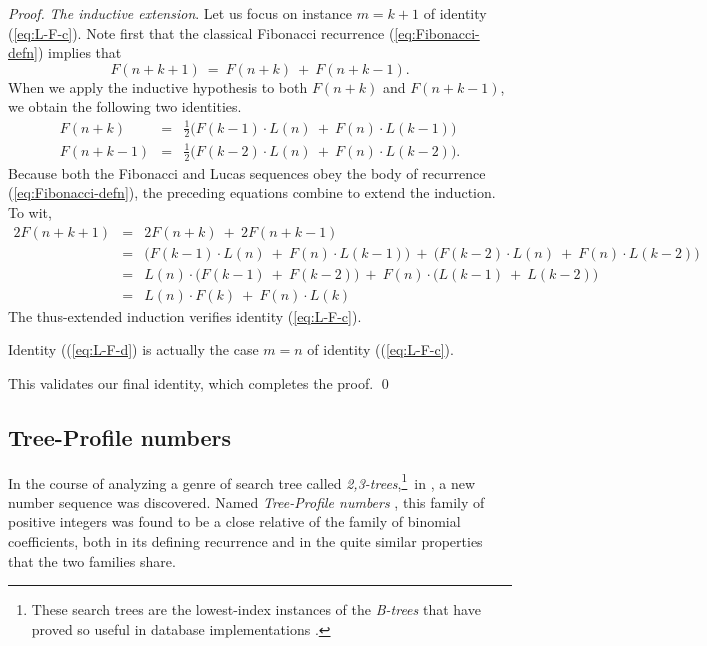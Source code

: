 \begin{proof}
\noindent
{\it The inductive extension}.
Let us focus on instance $m = k+1$ of identity (\ref{eq:L-F-c}).  Note
first that the classical Fibonacci recurrence
(\ref{eq:Fibonacci-defn}) implies that
\[ F(n + k +1) \ = \ F(n + k) \ + \ F(n + k - 1). \]
When we apply the inductive hypothesis to both $F(n + k)$ and $F(n + k
- 1)$, we obtain the following two identities.
\begin{eqnarray*}
F(n + k) & = & \frac{1}{2} \big( F(k-1) \cdot L(n) \ + \ F(n) \cdot
L(k-1) \big) \\
F(n + k - 1) & = & \frac{1}{2} \big( F(k-2) \cdot L(n) \ + \ F(n) \cdot L(k-2) \big).
\end{eqnarray*}
Because both the Fibonacci and Lucas sequences obey the body of
recurrence (\ref{eq:Fibonacci-defn}), the preceding equations combine
to extend the induction.  To wit,
\begin{eqnarray*}
2 F(n + k +1) & = & 2 F(n + k) \ + \ 2 F(n + k - 1) \\
              & = & 
\big( F(k-1) \cdot L(n) \ + \ F(n) \cdot L(k-1) \big)
\ + \
\big( F(k-2) \cdot L(n) \ + \ F(n) \cdot L(k-2) \big) \\
              & = &
L(n) \cdot \big( F(k-1) \ + \ F(k-2) \big)
\ + \
F(n) \cdot \big( L(k-1) \ + \ L(k-2) \big) \\
              & = &
L(n) \cdot F(k) \ + \ F(n) \cdot L(k)
\end{eqnarray*}
The thus-extended induction verifies identity (\ref{eq:L-F-c}).

\bigskip

Identity ((\ref{eq:L-F-d}) is actually the case $m=n$ of identity
((\ref{eq:L-F-c}).

This validates our final identity, which completes the proof.  \qed
\end{proof}



\subsection{Tree-Profile numbers}
\label{sec:Tree-Profile-numbers}
\index{Tree-Profile numbers}

In the course of analyzing a genre of search tree called {\it
  2,3-trees},\footnote{These search trees are the lowest-index
  instances of the {\it B-trees} that have proved so useful in database
  implementations \cite{CLRS}.}~in \cite{MillerPRS79,RosenbergS78}, a
new number sequence was discovered.
\index{search trees}
Named {\it Tree-Profile numbers} \cite{Rosenberg79}, this family of
positive integers was found to be a close relative of the family of
binomial coefficients, both in its defining recurrence and in the
quite similar properties that the two families share.

